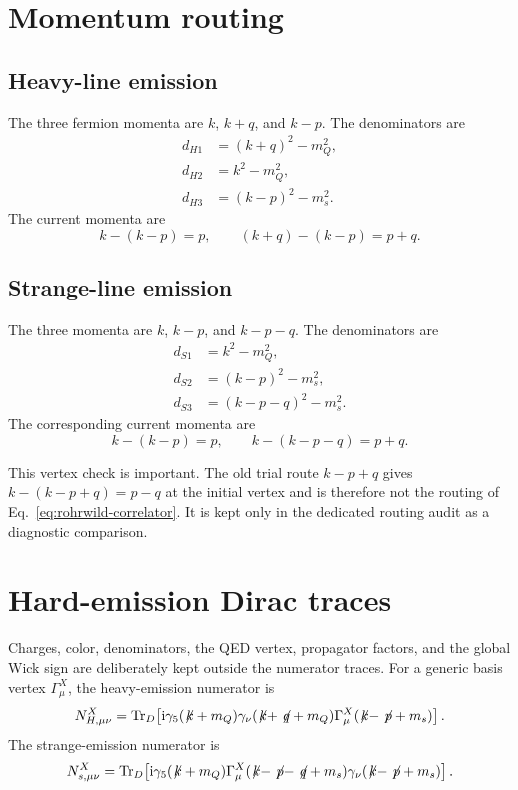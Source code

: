 \documentclass[11pt]{article}
\newcommand{\ii}{\mathrm{i}}
\newcommand{\Tr}{\operatorname{Tr}}
\newcommand{\slashedk}{\not\!k}
\newcommand{\slashedp}{\not\!p}
\newcommand{\slashedq}{\not\!q}
\begin{document}
\section{Momentum routing}

\subsection{Heavy-line emission}

The three fermion momenta are $k$, $k+q$, and $k-p$.  The denominators are
\begin{align}
  d_{H1}&=(k+q)^2-m_Q^2,\\
  d_{H2}&=k^2-m_Q^2,\\
  d_{H3}&=(k-p)^2-m_s^2.
\end{align}
The current momenta are
\begin{equation}
  k-(k-p)=p,\qquad (k+q)-(k-p)=p+q.
\end{equation}

\subsection{Strange-line emission}

The three momenta are $k$, $k-p$, and $k-p-q$.  The denominators are
\begin{align}
  d_{S1}&=k^2-m_Q^2,\\
  d_{S2}&=(k-p)^2-m_s^2,\\
  d_{S3}&=(k-p-q)^2-m_s^2.
\end{align}
The corresponding current momenta are
\begin{equation}
  k-(k-p)=p,\qquad k-(k-p-q)=p+q.
\end{equation}

This vertex check is important.  The old trial route $k-p+q$ gives
$k-(k-p+q)=p-q$ at the initial vertex and is therefore not the routing of
Eq.~\eqref{eq:rohrwild-correlator}.  It is kept only in the dedicated routing
audit as a diagnostic comparison.

\section{Hard-emission Dirac traces}

Charges, color, denominators, the QED vertex, propagator factors, and the
global Wick sign are deliberately kept outside the numerator traces.  For a
generic basis vertex $\Gamma^X_\mu$, the heavy-emission numerator is
\begin{equation}
  N^X_{H,\mu\nu}=\Tr_D\!\left[
  \ii\gamma_5(\slashedk+m_Q)\gamma_\nu
  (\slashedk+\slashedq+m_Q)\Gamma^X_\mu
  (\slashedk-\slashedp+m_s)\right].
  \label{eq:heavy-trace}
\end{equation}
The strange-emission numerator is
\begin{equation}
  N^X_{s,\mu\nu}=\Tr_D\!\left[
  \ii\gamma_5(\slashedk+m_Q)\Gamma^X_\mu
  (\slashedk-\slashedp-\slashedq+m_s)\gamma_\nu
  (\slashedk-\slashedp+m_s)\right].
  \label{eq:strange-trace}
\end{equation}
\end{document}
